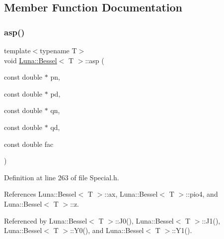 \subsection{Member Function Documentation}
\mbox{\label{structLuna_1_1Bessel_aaa00a95b752eec29e8c370e17f10f6c0}} 
\subsubsection{\texorpdfstring{asp()}{asp()}}
{\footnotesize\ttfamily template$<$typename T$>$ \\
void \hyperlink{structLuna_1_1Bessel}{Luna\+::\+Bessel}$<$ T $>$\+::asp (\begin{DoxyParamCaption}\item[{const double $\ast$}]{pn,  }\item[{const double $\ast$}]{pd,  }\item[{const double $\ast$}]{qn,  }\item[{const double $\ast$}]{qd,  }\item[{const double}]{fac }\end{DoxyParamCaption})\hspace{0.3cm}{\ttfamily [inline]}}



Definition at line 263 of file Special.\+h.



References Luna\+::\+Bessel$<$ T $>$\+::ax, Luna\+::\+Bessel$<$ T $>$\+::pio4, and Luna\+::\+Bessel$<$ T $>$\+::z.



Referenced by Luna\+::\+Bessel$<$ T $>$\+::\+J0(), Luna\+::\+Bessel$<$ T $>$\+::\+J1(), Luna\+::\+Bessel$<$ T $>$\+::\+Y0(), and Luna\+::\+Bessel$<$ T $>$\+::\+Y1().


